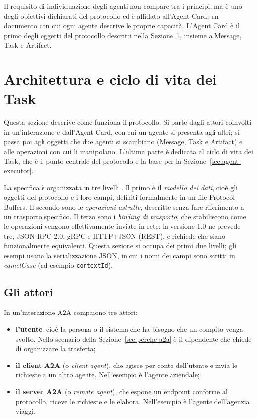 Il requisito di individuazione degli agenti non compare tra i principi, ma è uno degli obiettivi dichiarati del protocollo ed è affidato all'Agent Card, un documento con cui ogni agente descrive le proprie capacità. L'Agent Card è il primo degli oggetti del protocollo descritti nella Sezione~\ref{sec:a2a-architettura}, insieme a Message, Task e Artifact.

\section{Architettura e ciclo di vita dei Task}
\label{sec:a2a-architettura}

Questa sezione descrive come funziona il protocollo. Si parte dagli attori coinvolti in un'interazione e dall'Agent Card, con cui un agente si presenta agli altri; si passa poi agli oggetti che due agenti si scambiano (Message, Task e Artifact) e alle operazioni con cui li manipolano. L'ultima parte è dedicata al ciclo di vita dei Task, che è il punto centrale del protocollo e la base per la Sezione~\ref{sec:agent-executor}.

La specifica è organizzata in tre livelli \cite{a2aspec}. Il primo è il \emph{modello dei dati}, cioè gli oggetti del protocollo e i loro campi, definiti formalmente in un file Protocol Buffers. Il secondo sono le \emph{operazioni astratte}, descritte senza fare riferimento a un trasporto specifico. Il terzo sono i \emph{binding di trasporto}, che stabiliscono come le operazioni vengono effettivamente inviate in rete: la versione 1.0 ne prevede tre, JSON-RPC 2.0, gRPC e HTTP+JSON (REST), e richiede che siano funzionalmente equivalenti. Questa sezione si occupa dei primi due livelli; gli esempi usano la serializzazione JSON, in cui i nomi dei campi sono scritti in \emph{camelCase} (ad esempio \texttt{contextId}).

\subsection{Gli attori}

In un'interazione A2A compaiono tre attori:

\begin{itemize}
    \item \textbf{l'utente}, cioè la persona o il sistema che ha bisogno che un compito venga svolto. Nello scenario della Sezione~\ref{sec:perche-a2a} è il dipendente che chiede di organizzare la trasferta;
    \item \textbf{il client A2A} (o \emph{client agent}), che agisce per conto dell'utente e invia le richieste a un altro agente. Nell'esempio è l'agente aziendale;
    \item \textbf{il server A2A} (o \emph{remote agent}), che espone un endpoint conforme al protocollo, riceve le richieste e le elabora. Nell'esempio è l'agente dell'agenzia viaggi.
\end{itemize}

